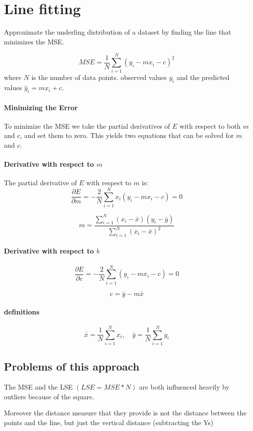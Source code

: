 \section{Line fitting}
Approximate the underling distribution of a dataset by
finding the line that minimizes the MSE.

\[
    MSE = \frac{1}{N} \sum_{i=1}^{N} \left( y_i - mx_i - c \right)^2
\]
where \( N \) is the number of data points.
observed values \( y_i \) and the predicted values
\( \hat{y}_i = mx_i + c \).

\paragraph*{Minimizing the Error}
To minimize the MSE we take the partial derivatives of \( E \)
with respect to both \( m \) and
\( c \), and set them to zero. This yields two equations that
can be solved for \( m \) and \( c \).

\paragraph*{Derivative with respect to \( m \)}
The partial derivative of \( E \) with respect to \( m \) is:
\[
    \frac{\partial E}{\partial m} = - \frac{2}{N} \sum_{i=1}^{N} x_i \left( y_i - mx_i - c \right) = 0
\]

\[
    m = \frac{\sum_{i=1}^{N} (x_i - \bar{x})(y_i - \bar{y})}{\sum_{i=1}^{N} (x_i - \bar{x})^2}
\]

\paragraph*{Derivative with respect to \(b\)}

\[
    \frac{\partial E}{\partial c} = - \frac{2}{N} \sum_{i=1}^{N} \left( y_i - mx_i - c \right) = 0
\]

\[
    c = \bar{y} - m\bar{x}
\]

\paragraph*{definitions}

\[
    \bar{x} = \frac{1}{N} \sum_{i=1}^{N} x_i, \quad \bar{y} = \frac{1}{N} \sum_{i=1}^{N} y_i
\]

\subsection{Problems of this approach}
The MSE and the LSE $(LSE = MSE * N)$ are both influenced heavily by outliers
because of the square.

Moreover the distance measure that they provide is not the distance between
the points and the line, but just the vertical distance (subtracting the Ys)


